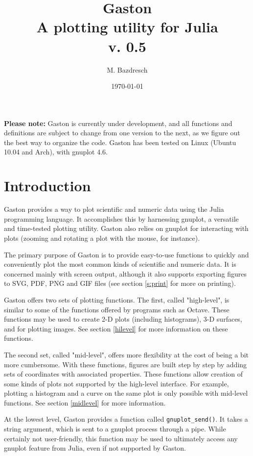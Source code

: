 \documentclass[11pt]{article}
\title{Gaston \\[0.8cm] \large A plotting utility for Julia \\[0.8cm] v. 0.5}
\author{M. Bazdresch}
\date{\today}
\newcommand{\cmd}[1]{\texttt{#1}}
\begin{document}
\maketitle

\textbf{Please note:} Gaston is currently under development, and all functions
and definitions are subject to change from one version to the next, as we
figure out the best way to organize the code. Gaston has been tested on Linux
(Ubuntu 10.04 and Arch), with gnuplot 4.6.

\section{Introduction}

Gaston provides a way to plot scientific and numeric data using the Julia
programming language. It accomplishes this by harnessing gnuplot, a versatile
and time-tested plotting utility. Gaston also relies on gnuplot for interacting
with plots (zooming and rotating a plot with the mouse, for instance).

The primary purpose of Gaston is to provide easy-to-use functions to quickly
and conveniently plot the most common kinds of scientific and numeric data. It
is concerned mainly with screen output, although it also supports exporting
figures to SVG, PDF, PNG and GIF files (see section \ref{s:print} for more on
printing).

Gaston offers two sets of plotting functions. The first, called "high-level",
is similar to some of the functions offered by programs such as Octave. These
functions may be used to create 2-D plots (including histograms), 3-D surfaces,
and for plotting images. See section \ref{hilevel} for more information on
these functions.

The second set, called "mid-level", offers more flexibility at the cost of
being a bit more cumbersome. With these functions, figures are built step by
step by adding sets of coordinates with associated properties. These functions
allow creation of some kinds of plots not supported by the high-level
interface. For example, plotting a histogram and a curve on the same plot is
only possible with mid-level functions. See section \ref{midlevel} for more
information.

At the lowest level, Gaston provides a function called \cmd{gnuplot\_send()}.
It takes a string argument, which is sent to a gnuplot process through a
pipe. While certainly not user-friendly, this function may be used to
ultimately access any gnuplot feature from Julia, even if not supported by
Gaston.
\end{document}
